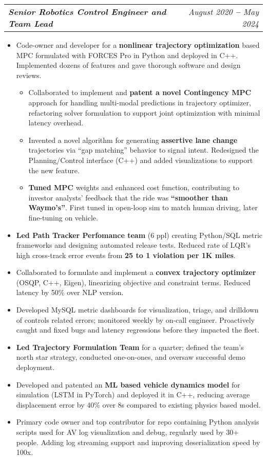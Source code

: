 \documentclass[letterpaper,11pt]{article}
\makeatletter
\def\vspaceAfterBullets{4pt} %
\def\bulletIndent{15pt} %
\newcommand{\bulletItem}[1]{
  \item\small{
    {#1}
  }
}
\newcommand{\titleAndDateHeading}[2]{
    \item
    \begin{tabular*}{1.0\textwidth}[b]{l@{\extracolsep{\fill}}r}
      {\bfseries\itshape\small #1} & \itshape\small #2
    \end{tabular*}
}
\newcommand{\outerBulletListStart}{\begin{itemize}[leftmargin=\bulletIndent]}
\newcommand{\outerBulletListEnd}{\end{itemize}\vspace{\vspaceAfterBullets}}
\newcommand{\innerBulletListStart}{\begin{itemize}[leftmargin=\bulletIndent]}
\newcommand{\innerBulletListEnd}{\end{itemize}}
\makeatother
\begin{document}
\titleAndDateHeading
{Senior Robotics Control Engineer and Team Lead}{August 2020 \textbf{--} May 2024}
\outerBulletListStart
\bulletItem{Code-owner and developer for a \textbf{nonlinear trajectory optimization} based MPC formulated with FORCES Pro in Python and deployed in C++. Implemented dozens of features and gave thorough software and design reviews.}
\innerBulletListStart
\bulletItem{Collaborated to implement and \textbf{patent a novel Contingency MPC} approach for handling multi-modal predictions in trajectory optimizer, refactoring solver formulation to support joint optimization with minimal latency overhead.}
\bulletItem{Invented a novel algorithm for generating \textbf{assertive lane change} trajectories via \enquote{gap matching} behavior to signal intent. Redesigned the Planning/Control interface (C++) and added visualizations to support the new feature.}
\bulletItem{\textbf{Tuned MPC} weights and enhanced cost function, contributing to investor analysts’ feedback that the ride was \textbf{\enquote{smoother than Waymo’s}}. First tuned in open-loop sim to match human driving, later fine-tuning on vehicle.}
\innerBulletListEnd
\bulletItem{\textbf{Led Path Tracker Perfomance team} (6 ppl) creating Python/SQL metric frameworks and designing automated release tests. Reduced rate of LQR's high cross-track error events from \textbf{25 to 1 violation per 1K miles}.}
\bulletItem{Collaborated to formulate and implement a \textbf{convex trajectory optimizer} (OSQP, C++, Eigen), linearizing objective and constraint terms. Reduced latency by 50\% over NLP version.}
\bulletItem{Developed MySQL metric dashboards for visualization, triage, and drilldown of controls related errors; monitored weekly by on-call engineer. Proactively caught and fixed bugs and latency regressions before they impacted the fleet.}
\bulletItem{\textbf{Led Trajectory Formulation Team} for a quarter; defined the team’s north star strategy, conducted one-on-ones, and oversaw successful demo deployment.}
\bulletItem{Developed and patented an \textbf{ML based vehicle dynamics model} for simulation (LSTM in PyTorch) and deployed it in C++, reducing average displacement error by 40\% over 8s compared to existing physics based model.}
\bulletItem{Primary code owner and top contributor for repo containing Python analysis scripts used for AV log visualization and debug, regularly used by 30+ people. Adding log streaming support and improving deserialization speed by 100x.}
\outerBulletListEnd
\end{document}
